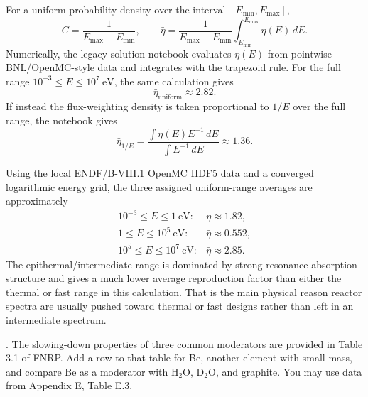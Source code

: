 \begin{adaptedsolution}
For a uniform probability density over the interval
$[E_{\min},E_{\max}]$,
\[
 C=\frac{1}{E_{\max}-E_{\min}},
 \qquad
 \bar{\eta}
 =\frac{1}{E_{\max}-E_{\min}}
  \int_{E_{\min}}^{E_{\max}}\eta(E)\,dE.
\]
Numerically, the legacy solution notebook evaluates $\eta(E)$ from pointwise
BNL/OpenMC-style data and integrates with the trapezoid rule.  For the full
range $10^{-3}\le E\le10^7~\mathrm{eV}$, the same calculation gives
\[
 \bar{\eta}_{\mathrm{uniform}}\approx 2.82.
\]
If instead the flux-weighting density is taken proportional to $1/E$ over
the full range, the notebook gives
\[
 \bar{\eta}_{1/E}
 =\frac{\int \eta(E)E^{-1}\,dE}{\int E^{-1}\,dE}
 \approx 1.36.
\]

Using the local ENDF/B-VIII.1 OpenMC HDF5 data and a converged logarithmic
energy grid, the three assigned uniform-range averages are approximately
\[
\begin{array}{ll}
10^{-3}\le E\le1~\mathrm{eV}: & \bar{\eta}\approx1.82,\\
1\le E\le10^5~\mathrm{eV}: & \bar{\eta}\approx0.552,\\
10^5\le E\le10^7~\mathrm{eV}: & \bar{\eta}\approx2.85.
\end{array}
\]
The epithermal/intermediate range is dominated by strong resonance absorption
structure and gives a much lower average reproduction factor than either the
thermal or fast range in this calculation.  That is the main physical reason
reactor spectra are usually pushed toward thermal or fast designs rather than
left in an intermediate spectrum.
\end{adaptedsolution}

\newpage

. The slowing-down properties of three common
moderators are provided in Table 3.1 of FNRP. Add a row to that table for Be,
another element with small mass, and compare Be as a moderator with
$\mathrm{H}_2\mathrm{O}$, $\mathrm{D}_2\mathrm{O}$, and graphite. You may use
data from Appendix E, Table E.3.


